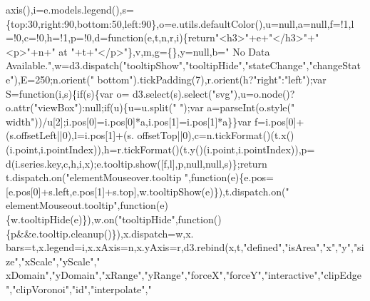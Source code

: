 \begin{DoxyCode}
      axis(),i=e.models.legend(),s=\{top:30,right:90,bottom:50,left:90\},o=e.utils.defaultColor(),u=null,a=null,f=!1,l
      =!0,c=!0,h=!1,p=!0,d=\textcolor{keyword}{function}(e,t,n,r,i)\{\textcolor{keywordflow}{return}\textcolor{stringliteral}{"<h3>"}+e+\textcolor{stringliteral}{"</h3>"}+\textcolor{stringliteral}{"<p>"}+n+\textcolor{stringliteral}{" at "}+t+\textcolor{stringliteral}{"</p>"}\},v,m,g=\{\},y=null,b=\textcolor{stringliteral}{"
      No Data Available."},w=d3.dispatch(\textcolor{stringliteral}{"tooltipShow"},\textcolor{stringliteral}{"tooltipHide"},\textcolor{stringliteral}{"stateChange"},\textcolor{stringliteral}{"changeState"}),E=250;n.orient(\textcolor{stringliteral}{"
      bottom"}).tickPadding(7),r.orient(h?\textcolor{stringliteral}{"right"}:\textcolor{stringliteral}{"left"});var S=\textcolor{keyword}{function}(i,s)\{\textcolor{keywordflow}{if}(s)\{var o=
      d3.select(s).select(\textcolor{stringliteral}{"svg"}),u=o.node()?o.attr(\textcolor{stringliteral}{"viewBox"}):null;\textcolor{keywordflow}{if}(u)\{u=u.split(\textcolor{stringliteral}{" "});var a=parseInt(o.style(\textcolor{stringliteral}{"
      width"}))/u[2];i.pos[0]=i.pos[0]*a,i.pos[1]=i.pos[1]*a\}\}var f=i.pos[0]+(s.offsetLeft||0),l=i.pos[1]+(s.
      offsetTop||0),c=n.tickFormat()(t.x()(i.point,i.pointIndex)),h=r.tickFormat()(t.y()(i.point,i.pointIndex)),p=
      d(i.series.key,c,h,i,x);e.tooltip.show([f,l],p,null,null,s)\};\textcolor{keywordflow}{return} t.dispatch.on(\textcolor{stringliteral}{"elementMouseover.tooltip
      "},\textcolor{keyword}{function}(e)\{e.pos=[e.pos[0]+s.left,e.pos[1]+s.top],w.tooltipShow(e)\}),t.dispatch.on(\textcolor{stringliteral}{"
      elementMouseout.tooltip"},\textcolor{keyword}{function}(e)\{w.tooltipHide(e)\}),w.on(\textcolor{stringliteral}{"tooltipHide"},\textcolor{keyword}{function}()\{p&&e.tooltip.cleanup()\}),x.dispatch=w,x.
      bars=t,x.legend=i,x.xAxis=n,x.yAxis=r,d3.rebind(x,t,\textcolor{stringliteral}{"defined"},\textcolor{stringliteral}{"isArea"},\textcolor{stringliteral}{"x"},\textcolor{stringliteral}{"y"},\textcolor{stringliteral}{"size"},\textcolor{stringliteral}{"xScale"},\textcolor{stringliteral}{"yScale"},\textcolor{stringliteral}{"
      xDomain"},\textcolor{stringliteral}{"yDomain"},\textcolor{stringliteral}{"xRange"},\textcolor{stringliteral}{"yRange"},\textcolor{stringliteral}{"forceX"},\textcolor{stringliteral}{"forceY"},\textcolor{stringliteral}{"interactive"},\textcolor{stringliteral}{"clipEdge"},\textcolor{stringliteral}{"clipVoronoi"},\textcolor{stringliteral}{"id"},\textcolor{stringliteral}{"interpolate"},\textcolor{stringliteral}{"
}
\end{DoxyCode}

